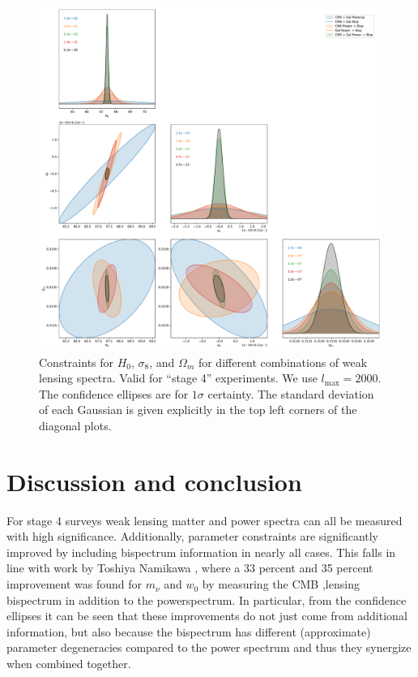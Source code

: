 \documentclass[11pt]{article} %
\begin{document}
\begin{figure}
    \centering
    \includegraphics[width=\textwidth]{figures/param_constraints_tight.pdf}
    \caption{Constraints for $H_0$, $\sigma_8$, and $\Omega_m$ for different combinations of weak lensing spectra. Valid for ``stage 4'' experiments. We use $l_{\max}=2000$. The confidence ellipses are for $1\sigma$ certainty. The standard deviation of each Gaussian is given explicitly in the top left corners of the diagonal plots.}
    \label{fig:paramconstraintstight}
\end{figure}

\section{Discussion and conclusion}\label{sec:discussion}
For stage 4 surveys weak lensing matter and power spectra can all be measured with high significance. Additionally, parameter constraints are significantly improved by including bispectrum information in nearly all cases. This falls in line with work by Toshiya Namikawa \cite{Namikawa_2016}, where a 33 percent and 35 percent improvement was found for $m_\nu$ and $w_0$ by measuring the CMB ,lensing bispectrum in addition to the powerspectrum. In particular, from the confidence ellipses it can be seen that these improvements do not just come from additional information, but also because the bispectrum has different (approximate) parameter degeneracies compared to the power spectrum and thus they synergize when combined together.
\end{document}
